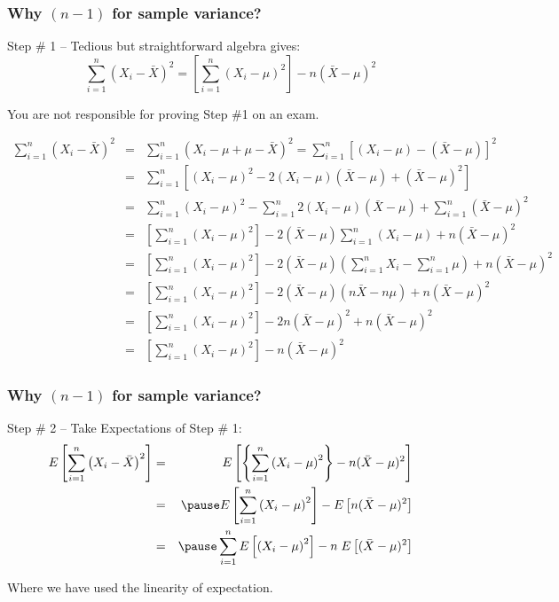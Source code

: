 \documentclass[handout]{beamer}
\begin{document}
\begin{frame}
\frametitle{Why $(n-1)$ for sample variance?}
\begin{block}{Step \# 1 -- Tedious but straightforward algebra gives:}
	$$\sum_{i=1}^n \left(X_i - \bar{X}\right)^2 = \left[  \sum_{i=1}^n \left(X_i - \mu\right)^2\right] - n(\bar{X}-\mu)^2$$
\end{block}
\alert{You are not responsible for proving Step \#1 on an exam.}

\end{frame}
\begin{frame}
\scriptsize
\begin{eqnarray*}
	\sum_{i=1}^n \left(X_i - \bar{X}\right)^2 &=& \sum_{i=1}^n \left(X_i - \mu + \mu - \bar{X}\right)^2 = \sum_{i=1}^n \left[(X_i -\mu) - (\bar{X} - \mu)\right]^2\\
		&=&\sum_{i=1}^n \left[(X_i -\mu)^2 - 2(X_i -\mu)(\bar{X} - \mu) + (\bar{X} - \mu)^2\right]\\
		&=&\sum_{i=1}^n (X_i -\mu)^2 - \sum_{i=1}^n 2(X_i -\mu)(\bar{X} - \mu) + \sum_{i=1}^n (\bar{X} - \mu)^2\\
		&=& \left[  \sum_{i=1}^n \left(X_i - \mu\right)^2\right]   - 2(\bar{X} - \mu) \sum_{i=1}^n (X_i -\mu)+n(\bar{X} - \mu)^2\\
				&=& \left[  \sum_{i=1}^n \left(X_i - \mu\right)^2\right]   - 2(\bar{X} - \mu) \left( \sum_{i=1}^n X_i- \sum_{i=1}^n \mu \right)+n(\bar{X} - \mu)^2\\
				&=& \left[  \sum_{i=1}^n \left(X_i - \mu\right)^2\right]   - 2(\bar{X} - \mu)(n\bar{X}-n\mu)+n(\bar{X} - \mu)^2\\
				&=&\left[  \sum_{i=1}^n \left(X_i - \mu\right)^2\right]   - 2n(\bar{X} - \mu)^2+n(\bar{X} - \mu)^2\\
				&=&\left[  \sum_{i=1}^n \left(X_i - \mu\right)^2\right]   - n(\bar{X} - \mu)^2
\end{eqnarray*}
\end{frame}


\begin{frame}
\frametitle{Why $(n-1)$ for sample variance?}
\begin{block}{Step \# 2 -- Take Expectations of Step \# 1:}
	\begin{eqnarray*}
		E\left[\sum_{i=1}^n \left(X_i - \bar{X}\right)^2\right] &=& E\left[\left\{  \sum_{i=1}^n \left(X_i - \mu\right)^2\right\} - n(\bar{X}-\mu)^2\right]\\
			&=&\pause E\left[ \sum_{i=1}^n \left(X_i - \mu\right)^2\right] -E\left[ n(\bar{X}-\mu)^2\right]\\
			&=&\pause  \sum_{i=1}^n E\left[\left(X_i - \mu\right)^2\right] -n\;E\left[ (\bar{X}-\mu)^2\right]\\
	\end{eqnarray*}
\end{block}
\alert{Where we have used the linearity of expectation.}
\end{frame}
\end{document}
